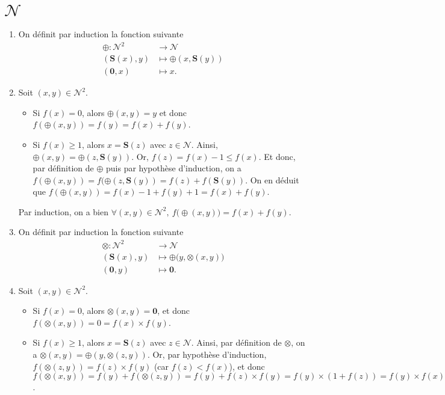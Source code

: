 \section{$\mathcal{N}$}

\newcommand{\ofact}{\charfusion[\mathbin]{\bigcirc}{\scriptstyle!}}

\begin{enumerate}
	\item On définit par induction la fonction suivante \begin{align*}
			\oplus: \mathcal{N}^2 &\longrightarrow \mathcal{N} \\
			(\mathbf{S}(x),y) &\longmapsto \oplus(x, \mathbf{S}(y))\\
			(\mathbf{0}, x) &\longmapsto x.
		\end{align*}
	\item Soit $(x,y) \in \mathcal{N}^2$.
		\begin{itemize}
			\item Si $f(x) = 0$, alors $\oplus(x,y) = y$\/ et donc $f(\oplus(x,y)) = f(y) = f(x) + f(y)$.
			\item Si $f(x) \ge 1$, alors  $x = \mathbf{S}(z)$\/ avec $z \in \mathcal{N}$. Ainsi, $\oplus(x,y) = \oplus(z, \mathbf{S}(y))$. Or, $f(z) = f(x) - 1 \le f(x)$. Et donc, par définition de $\oplus$\/ puis par hypothèse d'induction, on a $f(\oplus(x,y)) = f(\oplus(z, \mathbf{S}(y)) = f(z) + f(\mathbf{S}(y))$. On en déduit que $f(\oplus(x,y)) = f(x) - 1 + f(y) + 1 = f(x) + f(y)$.
		\end{itemize}
		Par induction, on a bien $\forall (x,y) \in \mathcal{N}^2,\:f\big({\oplus}(x,y)\big) = f(x) + f(y)$.
	\item On définit par induction la fonction suivante \begin{align*}
			\otimes: \mathcal{N}^2 &\longrightarrow \mathcal{N} \\
			(\mathbf{S}(x), y) &\longmapsto {\oplus}\big(y, {\otimes}(x,y)\big)\\
			(\mathbf{0}, y) &\longmapsto \mathbf{0}.
		\end{align*}
	\item Soit $(x,y) \in \mathcal{N}^2$.
		\begin{itemize}
			\item Si $f(x) = 0$, alors $\otimes(x,y) = \mathbf{0}$, et donc $f(\otimes(x,y)) = 0 = f(x) \times f(y)$.
			\item Si $f(x) \ge 1$, alors $x = \mathbf{S}(z)$\/ avec $z \in \mathcal{N}$. Ainsi, par définition de $\otimes$, on a $\otimes(x,y) = \oplus(y, \otimes(z,y))$. Or, par hypothèse d'induction, $f(\otimes(z,y)) = f(z) \times f(y)$\/ (car $f(z) < f(x)$), et donc $f(\otimes(x,y)) = f(y) + f(\otimes(z,y)) = f(y) + f(z) \times f(y) = f(y) \times (1 + f(z)) = f(y) \times f(x)$.

\end{itemize}
\end{enumerate}
